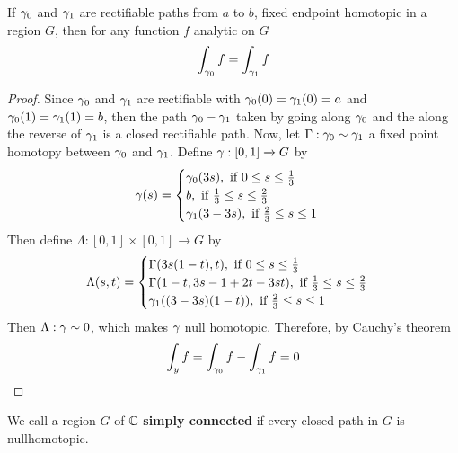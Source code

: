 \begin{theorem}\label{4.6.6}
    If $\gamma_0$ and $\gamma_1$ are rectifiable paths from $a$ to $b$, fixed endpoint
    homotopic in a region $G$, then for any function $f$ analytic on $G$
    \begin{equation*}
        \int_{\gamma_0}{f}=\int_{\gamma_1}{f}
    \end{equation*}
\end{theorem}
\begin{proof}
    Since $\gamma_0$ and $\gamma_1$ are rectifiable with $\gamma_0(0)=\gamma_1(0)=a$ and
    $\gamma_0(1)=\gamma_1(1)=b$,  then the path $\gamma_0-\gamma_1$ taken by going along $\gamma_0$
    and the along the reverse of $\gamma_1$ is a closed rectifiable path. Now, let
    $\Gamma:\gamma_0 \sim \gamma_1$ a fixed point homotopy between $\gamma_0$ and $\gamma_1$.
    Define $\gamma:[0,1] \xrightarrow{} G$ by
    \begin{equation*}
        \gamma(s)=\begin{cases}
            \gamma_0(3s), \text{ if } 0 \leq s \leq \frac{1}{3} \\
            b, \text{ if } \frac{1}{3} \leq s \leq \frac{2}{3}  \\
            \gamma_1(3-3s), \text{ if } \frac{2}{3} \leq s \leq 1   \\
        \end{cases}
    \end{equation*}
    Then define $\Lambda:[0,1] \times [0,1] \xrightarrow{} G$ by
    \begin{equation*}
        \Lambda(s,t)=\begin{cases}
            \Gamma(3s(1-t),t), \text{ if } 0 \leq s \leq \frac{1}{3} \\
            \Gamma(1-t, 3s-1+2t-3st), \text{ if } \frac{1}{3} \leq s \leq \frac{2}{3}  \\
            \gamma_1((3-3s)(1-t)), \text{ if } \frac{2}{3} \leq s \leq 1   \\
        \end{cases}
    \end{equation*}
    Then $\Lambda:\gamma \sim 0$, which makes  $\gamma$ null homotopic. Therefore, by
    Cauchy's theorem
    \begin{equation*}
        \int_{y}{f}=\int_{\gamma_0}{f}-\int_{\gamma_1}{f}=0
    \end{equation*}
\end{proof}

\begin{definition}
    We call a region $G$ of  $\mathbb{C}$  \textbf{simply connected} if every closed
    path in $G$ is nullhomotopic.
\end{definition}

